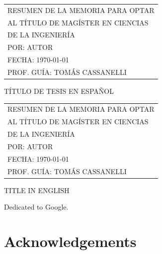 \documentclass[
	12pt,
	letterpaper,
  oneside
  ]{book}
\makeatletter
\newenvironment{preliminary}{
  \pagestyle{plain}\pagenumbering{roman}
  }{\cleardoublepage\pagenumbering{arabic}}
\newenvironment{dedication}{
  \if@openright\cleardoublepage\else\clearpage\fi
  \vspace*{\stretch{1}}
  \itshape
  \raggedleft
  \begingroup
  }{\par\vspace{\stretch{3}}\endgroup\newpage}
\newenvironment{acknowledgements}{
  \if@openright\cleardoublepage\else\clearpage\fi
  \chapter*{Acknowledgements}
  \begingroup
  }{\par\endgroup\newpage}
\makeatother
\begin{document}
  \newpage
  
  \begin{preliminary}
  
  
  \setcounter{page}{1}

  \begin{tabular}{l}
		RESUMEN DE LA MEMORIA PARA OPTAR \\
		AL TÍTULO DE MAGÍSTER EN CIENCIAS \\
		DE LA INGENIERÍA \\
		POR: \MakeUppercase{Autor} \\
		FECHA: \MakeUppercase{\today} \\
		PROF. GUÍA: TOMÁS CASSANELLI
	\end{tabular}

  \begin{center}
    \MakeUppercase{Título de tesis en español}
  \end{center}
  \lipsum[1-2]

  \newpage

  \begin{tabular}{l}
		RESUMEN DE LA MEMORIA PARA OPTAR \\
		AL TÍTULO DE MAGÍSTER EN CIENCIAS \\
		DE LA INGENIERÍA \\
		POR: \MakeUppercase{Autor} \\
		FECHA: \MakeUppercase{\today} \\
		PROF. GUÍA: TOMÁS CASSANELLI
	\end{tabular}

  \begin{center}
    \MakeUppercase{Title in English}
  \end{center}
  \lipsum[1-2]

  \newpage

  \begin{dedication}
    Dedicated to Google.
  \end{dedication}

  \newpage

  \begin{acknowledgements}
    \lipsum[1-2]
  \end{acknowledgements}

  \tableofcontents

  \listoftables

  \listoffigures

\end{preliminary}
\end{document}
